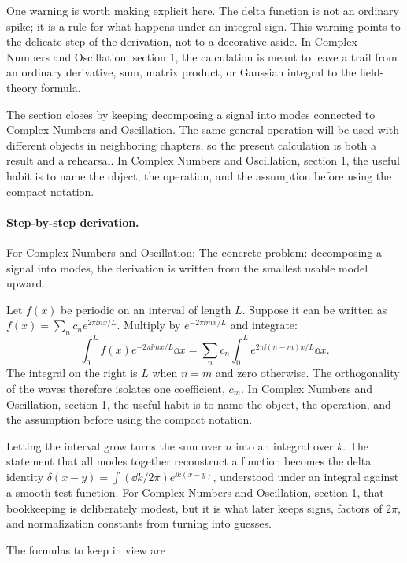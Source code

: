 One warning is worth making explicit here.  The delta function is not an ordinary spike; it is a rule for what happens under an integral sign.  This warning points to the delicate step of the derivation, not to a decorative aside.  In Complex Numbers and Oscillation, section 1, the calculation is meant to leave a trail from an ordinary derivative, sum, matrix product, or Gaussian integral to the field-theory formula.

The section closes by keeping decomposing a signal into modes connected to Complex Numbers and Oscillation.  The same general operation will be used with different objects in neighboring chapters, so the present calculation is both a result and a rehearsal.  In Complex Numbers and Oscillation, section 1, the useful habit is to name the object, the operation, and the assumption before using the compact notation.



\paragraph{Step-by-step derivation.}

For Complex Numbers and Oscillation: The concrete problem: decomposing a signal into modes, the derivation is written from the smallest usable model upward.

Let \(f(x)\) be periodic on an interval of length \(L\).  Suppose it can be written as \(f(x)=\sum_n c_ne^{2\pi\ii nx/L}\).  Multiply by \(e^{-2\pi\ii mx/L}\) and integrate:
\[
  \int_0^L f(x)e^{-2\pi\ii mx/L}\dd x
  =
  \sum_n c_n\int_0^L e^{2\pi\ii(n-m)x/L}\dd x.
\]
The integral on the right is \(L\) when \(n=m\) and zero otherwise.  The orthogonality of the waves therefore isolates one coefficient, \(c_m\).  In Complex Numbers and Oscillation, section 1, the useful habit is to name the object, the operation, and the assumption before using the compact notation.

Letting the interval grow turns the sum over \(n\) into an integral over \(k\).  The statement that all modes together reconstruct a function becomes the delta identity \(\delta(x-y)=\int(\dd k/2\pi)e^{\ii k(x-y)}\), understood under an integral against a smooth test function.  For Complex Numbers and Oscillation, section 1, that bookkeeping is deliberately modest, but it is what later keeps signs, factors of \(2\pi\), and normalization constants from turning into guesses.

The formulas to keep in view are

